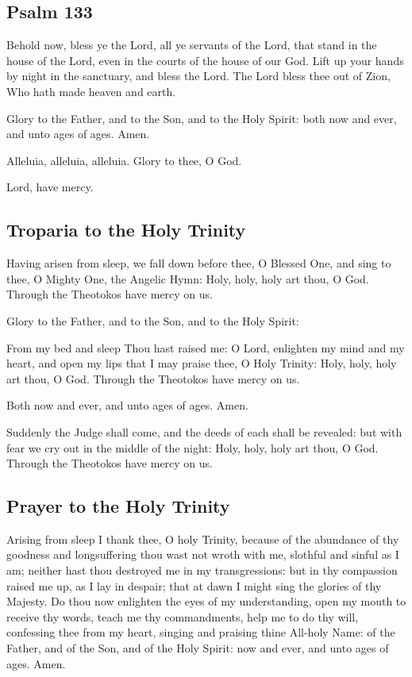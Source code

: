 \subsection{Psalm 133}

Behold now, bless ye the Lord, all ye servants of the Lord, that stand in the house of the Lord, even in the courts of the house of our God. Lift up your hands by night in the sanctuary, and bless the Lord. The Lord bless thee out of Zion, Who hath made heaven and earth.

Glory to the Father, and to the Son, and to the Holy Spirit: both now and ever, and unto ages of ages. Amen.

Alleluia, alleluia, alleluia. Glory to thee, O God. 

Lord, have mercy. 

\subsection{Troparia to the Holy Trinity}

Having arisen from sleep, we fall down before thee, O Blessed One, and sing to thee, O Mighty One, the Angelic Hymn: Holy, holy, holy art thou, O God. Through the Theotokos have mercy on us.

Glory to the Father, and to the Son, and to the Holy Spirit:

From my bed and sleep Thou hast raised me: O Lord, enlighten my mind and my heart, and open my lips that I may praise thee, O Holy Trinity: Holy, holy, holy art thou, O God. Through the Theotokos have mercy on us.

Both now and ever, and unto ages of ages. Amen.

Suddenly the Judge shall come, and the deeds of each shall be revealed: but with fear we cry out in the middle of the night: Holy, holy, holy art thou, O God. Through the Theotokos have mercy on us.

\subsection{Prayer to the Holy Trinity}

Arising from sleep I thank thee, O holy Trinity, because of the abundance of thy goodness and longsuffering thou wast not wroth with me, slothful and sinful as I am; neither hast thou destroyed me in my transgressions: but in thy compassion raised me up, as I lay in despair; that at dawn I might sing the glories of thy Majesty. Do thou now enlighten the eyes of my understanding, open my mouth to receive thy words, teach me thy commandments, help me to do thy will, confessing thee from my heart, singing and praising thine All-holy Name: of the Father, and of the Son, and of the Holy Spirit: now and ever, and unto ages of ages. Amen.

